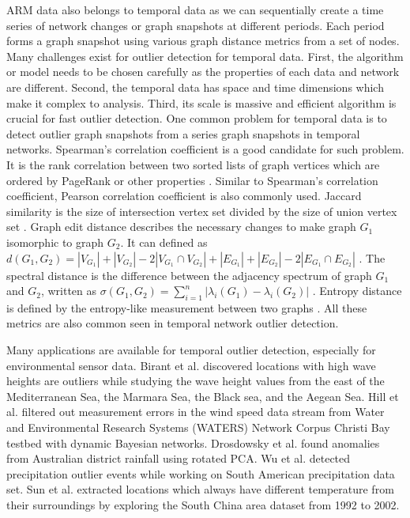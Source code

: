 \documentclass[letterpaper, 10 pt, conference]{ieeeconf}  %
\begin{document}
ARM data also belongs to temporal data as we can sequentially create a time series of network changes or graph snapshots at different periods. Each period forms a graph snapshot using various graph distance metrics from a set of nodes. Many challenges exist for outlier detection for temporal data. First, the algorithm or model needs to be chosen carefully as the properties of each data and network are different. Second, the temporal data has space and time dimensions which make it complex to analysis. Third, its scale is massive and efficient algorithm is crucial for fast outlier detection. One common problem for temporal data is to detect outlier graph snapshots from a series graph snapshots in temporal networks. Spearman's correlation coefficient is a good candidate for such problem. It is the rank correlation between two sorted lists of graph vertices which are ordered by PageRank or other properties \cite{papadimitriou2010web}. Similar to Spearman's correlation coefficient, Pearson correlation coefficient is also commonly used. Jaccard similarity is the size of intersection vertex set divided by the size of union vertex set \cite{jay2012systematic}. Graph edit distance describes the necessary changes to make graph $G_1$ isomorphic to graph $G_2$. It can defined as $d(G_1, G_2) = |V_{G_1}| + |V_{G_2}| - 2|V_{G_1} \cap V_{G_2}| + |E_{G_1}| + |E_{G_2}| - 2|E_{G_1} \cap E_{G_2}|$ \cite{papadimitriou2010web}. The spectral distance is the difference between the adjacency spectrum of graph $G_1$ and $G_2$, written as $\sigma(G_1, G_2) = \displaystyle\sum_{i=1}^{n}|\lambda_i(G_1) - \lambda_i(G_2)|$ \cite{jovanovic2012spectral}. Entropy distance is defined by the entropy-like measurement between two graphs \cite{pincombe2005anomaly}. All these metrics are also common seen in temporal network outlier detection.

Many applications are available for temporal outlier detection, especially for environmental sensor data. Birant et al. \cite{kut2006spatio} discovered locations with high wave heights are outliers while studying the wave height values from the east of the Mediterranean Sea, the Marmara Sea, the Black sea, and the Aegean Sea. Hill et al. \cite{hill2007real, hill2010anomaly} filtered out measurement errors in the wind speed data stream from Water and Environmental Research Systems (WATERS) Network Corpus Christi Bay testbed with dynamic Bayesian networks. Drosdowsky et al. \cite{drosdowsky1993analysis} found anomalies from Australian district rainfall using rotated PCA. Wu et al. \cite{wu2010spatio} detected precipitation outlier events while working on South American precipitation data set. Sun et al. \cite{yuxiang2005detecting} extracted locations which always have different temperature from their surroundings by exploring the South China area dataset from 1992 to 2002.
\end{document}
